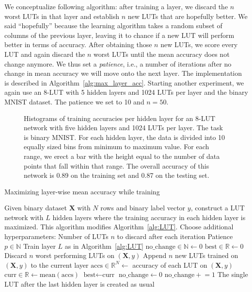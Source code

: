 We conceptualize following algorithm: after training a layer, we discard the $n$ worst LUTs in that layer and establish $n$ new LUTs that are hopefully better. We said \enquote{hopefully} because the learning algorithm takes a random subset of columns of the previous layer, leaving it to chance if a new LUT will perform better in terms of accuracy. After obtaining those $n$ new LUTs, we score every LUT and again discard the $n$ worst LUTs until the mean accuracy does not change anymore. We thus set a \textit{patience}, i.e., a number of iterations after no change in mean accuracy we will move onto the next layer. The implementation is described in Algorithm~\ref{alg:max_layer_acc}. Starting another experiment, we again use an 8-LUT with 5 hidden layers and 1024 LUTs per layer and the binary MNIST dataset. The patience we set to 10 and $n=50$.

\begin{figure}[!htb]
    \centering
    
    \caption{Histograms of training accuracies per hidden layer for an 8-LUT network with five hidden layers and 1024 LUTs per layer. The task is binary MNIST. For each hidden layer, the data is divided into 10 equally sized bins from minimum to maximum value. For each range, we erect a bar with the height equal to the number of data points that fall within that range. The overall accuracy of this network is 0.89 on the training set and 0.87 on the testing set.}
\label{fig:acc_layer_normal}
\end{figure}

\begin{algorithm}
  \caption{Maximizing layer-wise mean accuracy while training}
  \label{alg:max_layer_acc}
  \begin{algorithmic}
    \State Given binary dataset $\bm{X}$ with $N$ rows and binary label vector $y$, construct a LUT network with $L$ hidden layers where the training accuracy in each hidden layer is maximized. This algorithm modifies Algorithm~\ref{alg:LUT}.
    \vspace{1em}
    \State Choose additional hyperparameters:
    \Statein Number of LUTs $n$ to discard after each iteration
    \Statein Patience $p \in \mathds{N}$
      \State Train layer $L$ as in Algorithm~\ref{alg:LUT}
      \State $\text{no\_change} \in \mathds{N} \gets 0$
      \State $\text{best} \in \mathds{R} \gets 0$
        \State Discard $n$ worst performing LUTs on $(\bm{X}, y)$
        \State Append $n$ new LUTs trained on $(\bm{X}, y)$ to the current layer
        \State $\text{accs} \in \mathds{R}^N \gets $ accuracy of each LUT on $(\bm{X}, y)$
        \State $\text{curr} \in \mathds{R} \gets \text{mean}(\text{accs})$
          \State $\text{best} \gets \text{curr}$
          \State $\text{no\_change} \gets 0$
          \Else
            \State $\text{no\_change} \mathrel{+}= 1$
        \EndIf
      \EndWhile
    \EndFor
    \State The single LUT after the last hidden layer is created as usual
  \end{algorithmic}
\end{algorithm}

